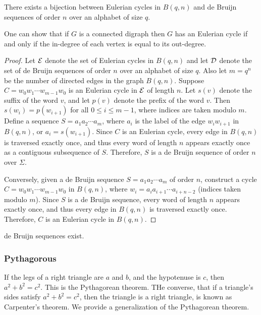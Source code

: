 \begin{theorem}
    There exists a bijection between Eulerian cycles in $B(q,n)$ and de Bruijn sequences of order $n$ over an alphabet of size $q$.
\end{theorem}

One can show that if $G$ is a connected digraph then $G$ has an Eulerian cycle if and only if the in-degree of each vertex is equal to its out-degree.

\begin{proof}
    Let $\mathcal{E}$ denote the set of Eulerian cycles in $B(q,n)$ and let $\mathcal{D}$ denote the set of de Bruijn sequences of order $n$ over an alphabet of size $q$. Also let $m = q^{n}$ be the number of directed edges in the graph $B(q,n)$. Suppose $C = w_{0}w_{1}\cdots w_{m-1}w_{0}$ is an Eulerian cycle in $\mathcal{E}$ of length $n$. Let $s(v)$ denote the suffix of the word $v$, and let $p(v)$ denote the prefix of the word $v$. Then $s(w_{i}) = p(w_{i+1})$ for all $0 \leq i \leq m-1$, where indices are taken modulo $m$. Define a sequence $S = a_{1}a_{2}\cdots a_{m}$, where $a_{i}$ is the label of the edge $w_{i}w_{i+1}$ in $B(q,n)$, or $a_{i} = s(w_{i+1})$. Since $C$ is an Eulerian cycle, every edge in $B(q,n)$ is traversed exactly once, and thus every word of length $n$ appears exactly once as a contiguous subsequence of $S$. Therefore, $S$ is a de Bruijn sequence of order $n$ over $\Sigma$.

    Conversely, given a de Bruijn sequence $S = a_{1}a_{2}\cdots a_{m}$ of order $n$, construct a cycle $C = w_{0}w_{1}\cdots w_{m-1}w_{0}$ in $B(q,n)$, where $w_{i} = a_{i}a_{i+1}\cdots a_{i+n-2}$ (indices taken modulo $m$). Since $S$ is a de Bruijn sequence, every word of length $n$ appears exactly once, and thus every edge in $B(q,n)$ is traversed exactly once. Therefore, $C$ is an Eulerian cycle in $B(q,n)$.
\end{proof}

\begin{corollary}
    de Bruijn sequences exist.
\end{corollary}

\subsubsection{Pythagorous}
If the legs of a right triangle are $a$ and $b$, and the hypotenuse is $c$, then $a^{2} + b^{2} = c^{2}$. This is the Pythagorean theorem. THe converse, that if a triangle's sides satisfy $a^{2} + b^{2} = c^{2}$, then the triangle is a right triangle, is known as Carpenter's theorem. We provide a generalization of the Pythagorean theorem.

